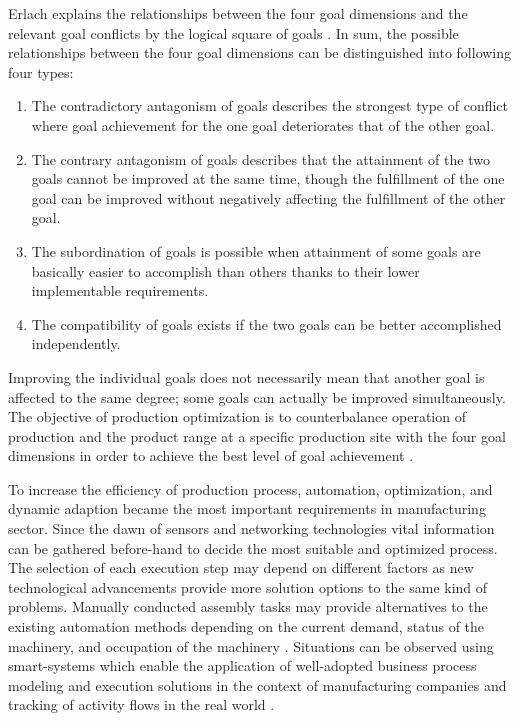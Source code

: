 Erlach \cite{LEANFAC} explains the relationships between the four goal dimensions and the relevant goal conflicts by the logical square of goals . In sum, the possible relationships between the four goal dimensions can be distinguished into following four types:
\begin{enumerate}
	\item The contradictory antagonism of goals describes the strongest type of conflict where goal achievement for the one goal deteriorates that of the other goal.
	\item The contrary antagonism of goals describes that the attainment of the two goals cannot be improved at the same time, though the fulfillment of the one goal can be improved without negatively affecting the fulfillment of the other goal.
	\item The subordination of goals is possible when attainment of some goals are basically easier to accomplish than others thanks to their lower implementable requirements.
	\item The compatibility of goals exists if the two goals can be better accomplished independently.
\end{enumerate}
Improving the individual goals does not necessarily mean that another goal is affected to the same degree; some goals can actually be improved simultaneously. The objective of production optimization is to counterbalance operation of production and the product range at a specific production site with the four goal dimensions in order to achieve the best level of goal achievement \cite{LEANFAC}.

To increase the efficiency of production process, automation, optimization, and dynamic adaption became the most important requirements in manufacturing sector. Since the dawn of sensors and networking technologies  vital information can be gathered before-hand to decide the most suitable and optimized process.  The selection of each execution step may depend on different factors as new technological advancements provide more solution options to the same kind of problems. Manually conducted assembly tasks may provide alternatives to the existing automation methods depending on the current demand, status of the machinery, and occupation of the machinery \cite{TIMURCIRP}. Situations can be observed using smart-systems  which enable the application of well-adopted business process modeling and execution  solutions in the context of manufacturing companies and tracking of activity flows in the real world \cite{CONWORKFLOW}.

